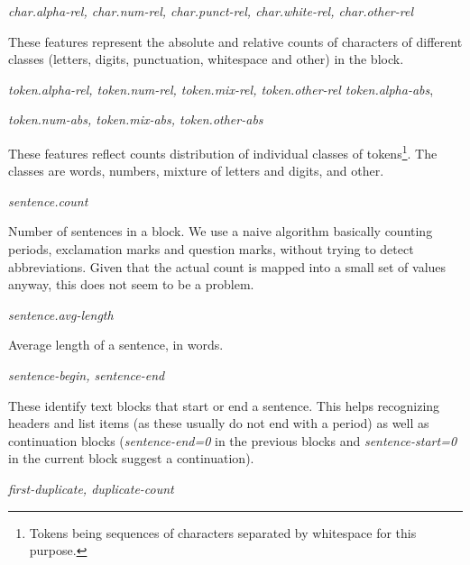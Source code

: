 \documentclass[12pt,a4paper, fleqn, leqno, twoside]{article}
\begin{document}
\begin{description}

\item{\it char.alpha-rel, char.num-rel, char.punct-rel, char.white-rel, char.other-rel}

These features represent the absolute and relative counts of characters
of different classes (letters, digits, punctuation, whitespace and
other) in the block.

\item{\it token.alpha-rel, token.num-rel, token.mix-rel, token.other-rel
token.alpha-abs},\\[-4.5ex]
\item{\it token.num-abs, token.mix-abs, token.other-abs}

These features reflect counts distribution of individual classes of
tokens\footnote{Tokens being sequences of characters separated by
whitespace for this purpose.}. The classes are words, numbers, mixture of
letters and digits, and other.

\item{\it sentence.count}

Number of sentences in a block. We use a naive algorithm basically
counting periods, exclamation marks and question marks, without trying to
detect abbreviations. Given that the actual count is mapped into a small
set of values anyway, this does not seem to be a problem.
          
\item{\it sentence.avg-length}

Average length of a sentence, in words.

\item{\it sentence-begin, sentence-end}

These identify text blocks that start or end a sentence.  This helps
recognizing headers and list items (as these usually do not end with a
period) as well as continuation blocks ({\it sentence-end=0} in the
previous blocks and {\it sentence-start=0} in the current block suggest
a continuation).
          
\item{\it first-duplicate, duplicate-count}


\end{description}
\end{document}
